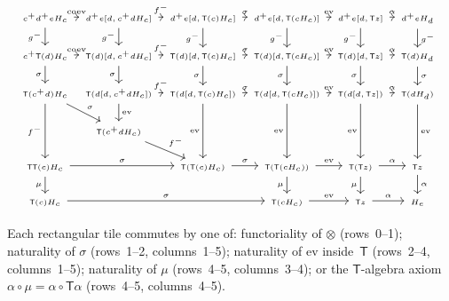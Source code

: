 \documentclass[11pt]{article}
\theoremstyle{definition}
\newcommand{\outp}[1]{#1^{+}}
\newcommand{\inpt}[1]{#1^{-}}
\newcommand{\ev}{\mathrm{ev}}
\newcommand{\coev}{\mathrm{coev}}
\newcommand{\Fun}[1]{\textsf{#1}}
\begin{document}
\begin{landscape}
\thispagestyle{empty}
\[
\resizebox{\linewidth}{!}{%
\begin{tikzcd}[column sep=0.4em, row sep=1.2em, every label/.append style={font=\tiny}, font=\tiny, ampersand replacement=\&]
\outp c\outp d e H_c
  \ar[r, "{\coev}"]
  \ar[d, "{\inpt g}"']
\& \outp d e{[d,\outp c d H_c]}
  \ar[r, "{\inpt f}"]
  \ar[d, "{\inpt g}"']
\& \outp d e{[d,\Fun T(c) H_c]}
  \ar[r, "{\sigma}"]
  \ar[d, "{\inpt g}"']
\& \outp d e{[d,\Fun T(c H_c)]}
  \ar[r, "{\ev}"]
  \ar[d, "{\inpt g}"']
\& \outp d e{[d,\Fun Tz]}
  \ar[r, "{\alpha}"]
  \ar[d, "{\inpt g}"']
\& \outp d e H_d
  \ar[d, "{\inpt g}"]
\\
\outp c\Fun T(d) H_c
  \ar[d, "{\sigma}"']
  \ar[r, "{\coev}"]
\& \Fun T(d){[d,\outp c d H_c]}
  \ar[r, "{\inpt f}"]
  \ar[d, "{\sigma}"']
\& \Fun T(d){[d,\Fun T(c) H_c]}
  \ar[r, "{\sigma}"]
  \ar[d, "{\sigma}"']
\& \Fun T(d){[d,\Fun T(c H_c)]}
  \ar[r, "{\ev}"]
  \ar[d, "{\sigma}"']
\& \Fun T(d){[d,\Fun Tz]}
  \ar[r, "{\alpha}"]
  \ar[d, "{\sigma}"']
\& \Fun T(d) H_d
  \ar[d, "{\sigma}"]
\\
\Fun T(\outp c d) H_c
  \ar[dd, "{\inpt f}"']
  \ar[dr, "{\sigma}"]
\& \Fun T(d{[d,\outp c d H_c]})
  \ar[r, "{\inpt f}"]
  \ar[d, "{\ev}"]
\& \Fun T(d{[d,\Fun T(c) H_c]})
  \ar[r, "{\sigma}"]
  \ar[dd, "{\ev}"']
\& \Fun T(d{[d,\Fun T(c H_c)]})
  \ar[r, "{\ev}"]
  \ar[dd, "{\ev}"']
\& \Fun T(d{[d,\Fun Tz]})
  \ar[r, "{\alpha}"]
  \ar[dd, "{\ev}"']
\& \Fun T(d H_d)
  \ar[dd, "{\ev}"]
\\
\& \Fun T(\outp c d H_c)
  \ar[dr, "{\inpt f}"]
\&\&\&\&
\\
\Fun T\Fun T(c) H_c
  \ar[d, "{\mu}"']
  \ar[rr, "{\sigma}"]
\&\& \Fun T(\Fun T(c) H_c)
  \ar[r, "{\sigma}"]
\& \Fun T(\Fun T(c H_c))
  \ar[r, "{\ev}"]
  \ar[d, "{\mu}"']
\& \Fun T(\Fun Tz)
  \ar[r, "{\alpha}"]
  \ar[d, "{\mu}"']
\& \Fun Tz
  \ar[d, "{\alpha}"]
\\
\Fun T(c) H_c
  \ar[rrr, "{\sigma}"]
\&\&\& \Fun T(c H_c)
  \ar[r, "{\ev}"]
\& \Fun Tz
  \ar[r, "{\alpha}"]
\& H_e
\end{tikzcd}
}
\]
\end{landscape}

Each rectangular tile commutes by one of: functoriality of $\otimes$ (rows~0--1); naturality of $\sigma$ (rows~1--2, columns~1--5); naturality of $\ev$ inside~$\Fun{T}$ (rows~2--4, columns~1--5); naturality of $\mu$ (rows~4--5, columns~3--4); or the $\Fun{T}$-algebra axiom $\alpha\circ\mu=\alpha\circ\Fun{T}\alpha$ (rows~4--5, columns~4--5).
\end{document}
